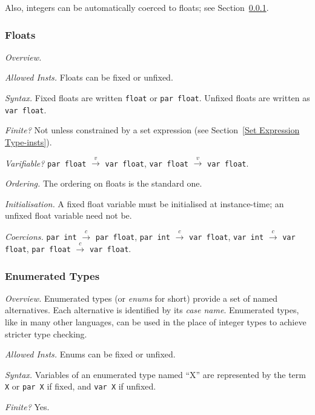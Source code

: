 \documentclass[10pt]{scrartcl}
\newcommand{\TyThing}[1]{\vspace{1.2mm}\noindent\emph{#1} }
\newcommand{\TyOverview}{\TyThing{Overview.}}
\newcommand{\TyInsts}{\TyThing{Allowed Insts.}}
\newcommand{\TySyntax}{\TyThing{Syntax.}}
\newcommand{\TyFiniteType}{\TyThing{Finite?}}
\newcommand{\TyVarifiable}{\TyThing{Varifiable?}}
\newcommand{\TyOrdering}{\TyThing{Ordering.}}
\newcommand{\TyInit}{\TyThing{Initialisation.}}
\newcommand{\TyCoercions}{\TyThing{Coercions.}}
\newcommand{\coerce}[2]{#1 $\stackrel{c}{\rightarrow}$ #2}
\newcommand{\varify}[2]{#1 $\stackrel{v}{\rightarrow}$ #2}
\begin{document}
Also, integers can be automatically coerced to floats;  see
Section~\ref{Floats}.

\subsubsection{Floats}
        \label{Floats}
\TyOverview
\CommonFloatsOverview{}

\TyInsts
Floats can be fixed or unfixed.

\TySyntax
Fixed floats are written \texttt{float} or \texttt{par float}.  Unfixed
floats are written as \texttt{var float}.

\TyFiniteType
Not unless constrained by a set expression (see Section~\ref{Set Expression
Type-insts}).

\TyVarifiable
\varify{\texttt{par float}}{\texttt{var float}},
\varify{\texttt{var float}}{\texttt{var float}}.

\TyOrdering
The ordering on floats is the standard one.

\TyInit
A fixed float variable must be initialised at instance-time;  an unfixed
float variable need not be.

\TyCoercions
\coerce{\texttt{par int}}{\texttt{par float}},
\coerce{\texttt{par int}}{\texttt{var float}},
\coerce{\texttt{var int}}{\texttt{var float}},
\coerce{\texttt{par float}}{\texttt{var float}}.

\subsubsection{Enumerated Types}
        \label{Enumerated Types}
\TyOverview
Enumerated types (or \emph{enums} for short) provide a set of named
alternatives. Each alternative is identified by its \emph{case name}.
Enumerated types, like in many other languages, can be used in the place of
integer types to achieve stricter type checking.

\TyInsts
Enums can be fixed or unfixed.

\TySyntax
Variables of an enumerated type named ``X'' are represented by the term
\texttt{X} or \texttt{par X} if fixed, and \texttt{var X}
if unfixed.

\TyFiniteType
Yes.
\end{document}
